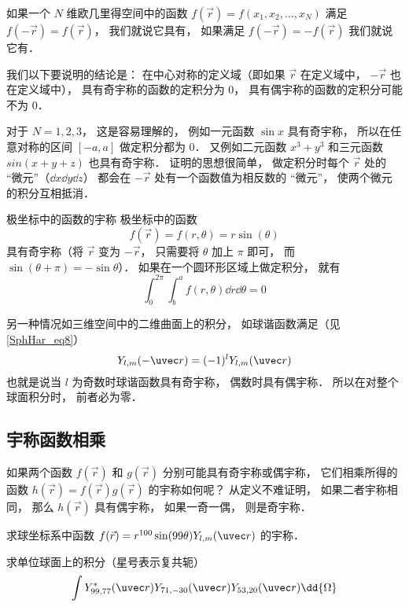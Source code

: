 

如果一个 $N$ 维欧几里得空间中的函数 $f(\vec r) = f(x_1, x_2, \dots, x_N)$ 满足  $f(-\vec r) = f(\vec r)$， 我们就说它具有， 如果满足  $f(-\vec r) = -f(\vec r)$ 我们就说它有．

我们以下要说明的结论是： 在中心对称的定义域（即如果 $\vec r$ 在定义域中， $-\vec r$ 也在定义域中）， 具有奇宇称的函数的定积分为 0， 具有偶宇称的函数的定积分可能不为 0．

对于 $N = 1, 2, 3$， 这是容易理解的， 例如一元函数 $\sin x$ 具有奇宇称， 所以在任意对称的区间 $[-a, a]$ 做定积分都为 0． 又例如二元函数 $x^3 + y^3$ 和三元函数 $sin(x + y + z)$ 也具有奇宇称． 证明的思想很简单， 做定积分时每个 $\vec r$ 处的 “微元”（$\dd{x}\dd{y}\dd{z}$） 都会在 $-\vec r$ 处有一个函数值为相反数的 “微元”， 使两个微元的积分互相抵消．

\begin{exam}{极坐标中的函数的宇称}
极坐标中的函数
\begin{equation}\label{IntPry_eq1}
f(\vec r) = f(r, \theta) = r\sin(\theta)
\end{equation}
具有奇宇称（将 $\vec r$ 变为 $-\vec r$， 只需要将 $\theta$ 加上 $\pi$ 即可， 而 $\sin(\theta + \pi) = -\sin\theta$）． 如果在一个圆环形区域上做定积分， 就有
\begin{equation}
\int_0^{2\pi} \int_b^a f(r, \theta) \dd{r} \dd{\theta} = 0
\end{equation}
\end{exam}

另一种情况如三维空间中的二维曲面上的积分， 如球谐函数满足（见\autoref{SphHar_eq8}）
\begin{equation}\label{IntPry_eq3}
Y_{l,m}(-\uvec r) = (-1)^l Y_{l,m}(\uvec r)
\end{equation}
也就是说当 $l$ 为奇数时球谐函数具有奇宇称， 偶数时具有偶宇称． 所以在对整个球面积分时， 前者必为零．

\subsection{宇称函数相乘}
如果两个函数 $f(\vec r)$ 和 $g(\vec r)$ 分别可能具有奇宇称或偶宇称， 它们相乘所得的函数 $h(\vec r) = f(\vec r) g(\vec r)$ 的宇称如何呢？ 从定义不难证明， 如果二者宇称相同， 那么 $h(\vec r)$ 具有偶宇称， 如果一奇一偶， 则是奇宇称．

\begin{exer}{}
求球坐标系中函数 $f(\vec r) = r^{100}\sin(99\theta) Y_{l, m}(\uvec r)$ 的宇称．
\end{exer}

\begin{exer}{}
求单位球面上的积分（星号表示复共轭）
\begin{equation}
\int Y_{99, 77}^*(\uvec r) Y_{71, -30}(\uvec r) Y_{53, 20}(\uvec r) \dd{\Omega}
\end{equation}
\end{exer}
